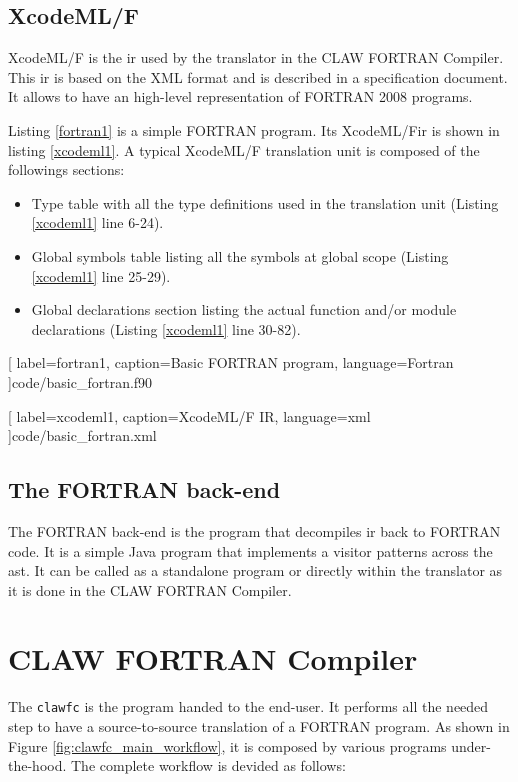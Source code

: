 \documentclass[a4paper, 11pt]{report}
\def\clawfcomp{CLAW FORTRAN Compiler\xspace}
\def\xcodeml{XcodeML/F\xspace}
\def\clawfc{\lstinline!clawfc!\xspace}
\begin{document}
\subsection{\xcodeml}
\xcodeml\cite{omni:xcodemlf95,omni:xcodemlf2008} is the \gls{ir} used by the
translator in the CLAW FORTRAN Compiler. This \gls{ir} is based on the XML
format and is described in a specification document. It allows to have an
high-level representation of FORTRAN 2008 programs.

Listing \ref{fortran1} is a simple FORTRAN program. Its \xcodeml \gls{ir} is
shown in listing \ref{xcodeml1}. A typical \xcodeml translation unit is
composed of the followings sections:
\begin{itemize}
\item Type table with all the type definitions used in the translation unit
(Listing \ref{xcodeml1} line 6-24).
\item Global symbols table listing all the symbols at global scope (Listing
\ref{xcodeml1} line 25-29).
\item Global declarations section listing the actual function and/or module
declarations (Listing \ref{xcodeml1} line 30-82).
\end{itemize}


  [
    label=fortran1,
    caption=Basic FORTRAN program,
    language=Fortran
  ]{code/basic_fortran.f90}


  [
    label=xcodeml1,
    caption=\xcodeml IR,
    language=xml
  ]{code/basic_fortran.xml}

\subsection{The FORTRAN back-end}
The FORTRAN back-end is the program that decompiles \gls{ir} back to FORTRAN
code. It is a simple Java program that implements a visitor patterns across
the \gls{ast}. It can be called as a standalone program or directly within the
translator as it is done in the \clawfcomp.

\section{\clawfcomp}

The \clawfc is the program handed to the end-user. It performs all the needed
step to have a source-to-source translation of a FORTRAN program. As shown in
Figure \ref{fig:clawfc_main_workflow}, it is composed by various programs
under-the-hood. The complete workflow is devided as follows:
\end{document}
